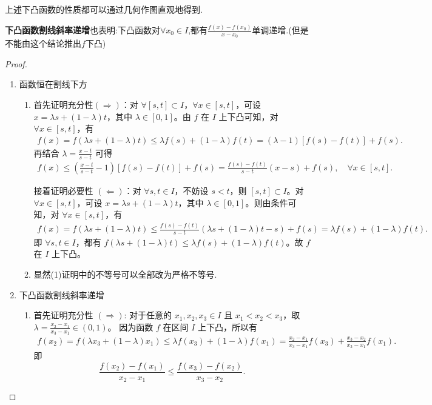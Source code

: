 \documentclass[../../main.tex]{subfiles}
\begin{document}
\begin{remark}
上述下凸函数的性质都可以通过几何作图直观地得到.
\end{remark}
\begin{note}
\textbf{下凸函数割线斜率递增}也表明:下凸函数对$\forall x_0\in I$,都有$\frac{f(x)-f(x_0)}{x-x_0}$单调递增.(但是不能由这个结论推出$f$下凸)
\end{note}
\begin{proof}
\begin{enumerate}
\item {\heiti 函数恒在割线下方}\begin{enumerate}[(1)]
\item 首先证明充分性$(\Rightarrow)$：对 $\forall [s,t] \subset I$，$\forall x\in [s,t]$，可设 $x = \lambda s+(1 - \lambda)t$，其中 $\lambda \in [0,1]$。由 $f$ 在 $I$ 上下凸可知，对 $\forall x\in [s,t]$，有
\begin{align*}
f(x) = f(\lambda s+(1 - \lambda)t) 
\leqslant \lambda f(s)+(1 - \lambda)f(t) 
= (\lambda - 1)[f(s) - f(t)]+f(s).
\end{align*}
再结合 $\lambda=\frac{x - t}{s - t}$ 可得
\begin{align*}
f(x) \leqslant \left(\frac{x - t}{s - t}-1\right)[f(s) - f(t)]+f(s)
= \frac{f(s) - f(t)}{s - t}(x - s)+f(s), \quad \forall x\in [s,t].
\end{align*}

接着证明必要性 $(\Leftarrow)$：对 $\forall s,t\in I$，不妨设 $s < t$，则 $[s,t] \subset I$。对 $\forall x\in [s,t]$，可设 $x = \lambda s+(1 - \lambda)t$，其中 $\lambda \in [0,1]$。则由条件可知，对 $\forall x\in [s,t]$，有
\begin{align*}
f(x) = f(\lambda s+(1 - \lambda)t) 
\leqslant \frac{f(s) - f(t)}{s - t}(\lambda s+(1 - \lambda)t - s)+f(s) 
= \lambda f(s)+(1 - \lambda)f(t).
\end{align*}
即 $\forall s,t\in I$，都有 $f(\lambda s+(1 - \lambda)t) \leqslant \lambda f(s)+(1 - \lambda)f(t)$。故 $f$ 在 $I$ 上下凸。      

\item 显然(1)证明中的不等号可以全部改为严格不等号.
\end{enumerate}

\item {\heiti 下凸函数割线斜率递增}\begin{enumerate}[(1)]
\item 首先证明充分性 $(\Rightarrow)$:
对于任意的 $x_1, x_2, x_3 \in I$ 且 $x_1 < x_2 < x_3$，取 $\lambda = \frac{x_2 - x_1}{x_3 - x_1} \in (0, 1)$。
因为函数 $f$ 在区间 $I$ 上下凸，所以有
\begin{align*}
f(x_2) = f(\lambda x_3 + (1 - \lambda) x_1) 
\leqslant \lambda f(x_3) + (1 - \lambda) f(x_1) 
= \frac{x_2 - x_1}{x_3 - x_1} f(x_3) + \frac{x_3 - x_2}{x_3 - x_1} f(x_1).
\end{align*}
即
\[
\frac{f(x_2) - f(x_1)}{x_2 - x_1} \leqslant \frac{f(x_3) - f(x_2)}{x_3 - x_2}.
\]


\end{enumerate}
\end{enumerate}
\end{proof}
\end{document}
